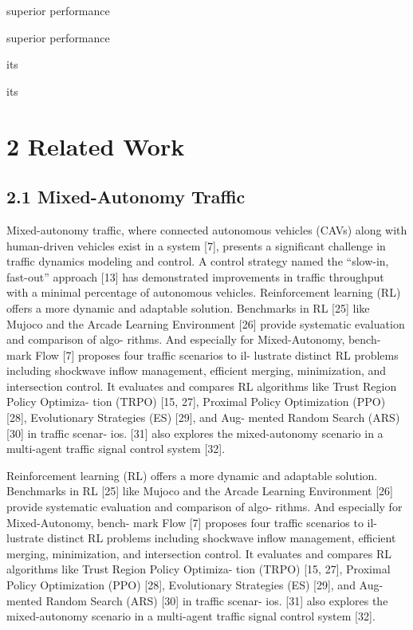 \documentclass[12pt]{article}
\begin{document}
superior performance


superior performance


its


its


\section{2 Related Work}


\subsection{2.1 Mixed-Autonomy Traffic}

Mixed-autonomy traffic, where connected autonomous
vehicles (CAVs) along with human-driven vehicles exist
in a system [7], presents a significant challenge in
traffic dynamics modeling and control. A control
strategy named the “slow-in, fast-out” approach [13]
has demonstrated improvements in traffic throughput
with a minimal percentage of autonomous vehicles.
Reinforcement learning (RL) offers a more dynamic
and adaptable solution. Benchmarks in RL [25] like
Mujoco and the Arcade Learning Environment [26]
provide systematic evaluation and comparison of algo-
rithms. And especially for Mixed-Autonomy, bench-
mark Flow [7] proposes four traffic scenarios to il-
lustrate distinct RL problems including shockwave
inflow management, efficient merging,
minimization,
and intersection control.
It evaluates and compares
RL algorithms like Trust Region Policy Optimiza-
tion (TRPO) [15, 27], Proximal Policy Optimization
(PPO) [28], Evolutionary Strategies (ES) [29], and Aug-
mented Random Search (ARS) [30] in traffic scenar-
ios. [31] also explores the mixed-autonomy scenario in a
multi-agent traffic signal control system [32].


Reinforcement learning (RL) offers a more dynamic
and adaptable solution. Benchmarks in RL [25] like
Mujoco and the Arcade Learning Environment [26]
provide systematic evaluation and comparison of algo-
rithms. And especially for Mixed-Autonomy, bench-
mark Flow [7] proposes four traffic scenarios to il-
lustrate distinct RL problems including shockwave
inflow management, efficient merging,
minimization,
and intersection control.
It evaluates and compares
RL algorithms like Trust Region Policy Optimiza-
tion (TRPO) [15, 27], Proximal Policy Optimization
(PPO) [28], Evolutionary Strategies (ES) [29], and Aug-
mented Random Search (ARS) [30] in traffic scenar-
ios. [31] also explores the mixed-autonomy scenario in a
multi-agent traffic signal control system [32].
\end{document}
